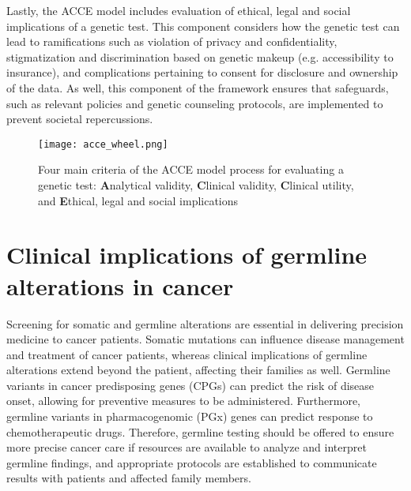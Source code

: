 Lastly, the ACCE model includes evaluation of ethical, legal and social implications of a genetic test. This component considers how the genetic test can lead to ramifications such as violation of privacy and confidentiality, stigmatization and discrimination based on genetic makeup (e.g. accessibility to insurance), and complications pertaining to consent for disclosure and ownership of the data. As well, this component of the framework ensures that safeguards, such as relevant policies and genetic counseling protocols, are implemented to prevent societal repercussions.


\begin{figure}[H]
	\centering
	\texttt{[image: acce\_wheel.png]}
	\caption{Four main criteria of the ACCE model process for evaluating a genetic test: \textbf{A}nalytical validity, \textbf{C}linical validity, \textbf{C}linical utility, and \textbf{E}thical, legal and social implications}
	\label{fig:acce_wheel}
\end{figure}



\section{Clinical implications of germline alterations in cancer}
\label{sec:Clinicalimplicationsofgermlinealterationsincancer}

Screening for somatic and germline alterations are essential in delivering precision medicine to cancer patients. Somatic mutations can influence disease management and treatment of cancer patients, whereas clinical implications of germline alterations extend beyond the patient, affecting their families as well. Germline variants in cancer predisposing genes (CPGs) can predict the risk of disease onset, allowing for preventive measures to be administered. Furthermore, germline variants in pharmacogenomic (PGx) genes can predict response to chemotherapeutic drugs. Therefore, germline testing should be offered to ensure more precise cancer care if resources are available to analyze and interpret germline findings, and appropriate protocols are established to communicate results with patients and affected family members.

